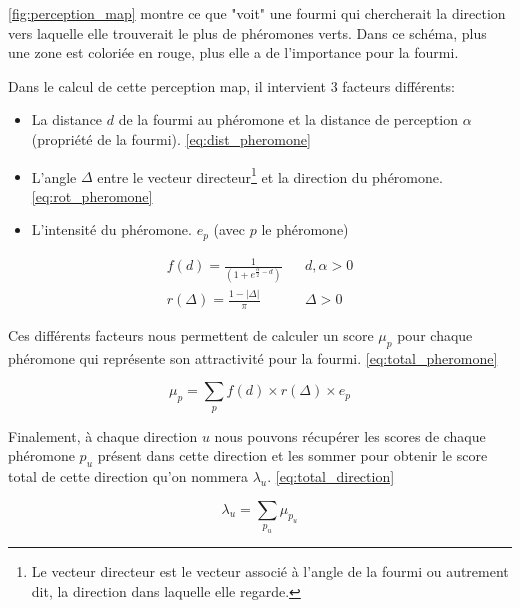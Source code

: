\documentclass{EPUProjetDi}
\begin{document}
\autoref{fig:perception_map} montre ce que "voit" une fourmi qui chercherait la direction vers laquelle elle trouverait le plus de phéromones verts.
Dans ce schéma, plus une zone est coloriée en rouge, plus elle a de l'importance pour la fourmi.

\pagebreak

Dans le calcul de cette perception map, il intervient 3 facteurs différents:
\begin{itemize}
    \item La distance $d$ de la fourmi au phéromone et la distance de perception $\alpha$ (propriété de la fourmi). \eqref{eq:dist_pheromone}
    \item L'angle $\Delta$ entre le vecteur directeur\footnote{Le vecteur directeur est le vecteur associé à l'angle de la fourmi ou
    autrement dit, la direction dans laquelle elle regarde.} et la direction du phéromone. \eqref{eq:rot_pheromone}
    \item L'intensité du phéromone. $e_p$ (avec $p$ le phéromone)
\end{itemize}

\begin{subequations}
\begin{align}
    f(d)=\frac{1}{(1 + e^{\frac{\alpha}{2} - d})} && d,\alpha > 0 \label{eq:dist_pheromone}\\
    r(\Delta)= \frac{1-\left\lvert \Delta\right\rvert}{\pi} && \Delta \label{eq:rot_pheromone}> 0
\end{align}
\end{subequations}

Ces différents facteurs nous permettent de calculer un score $\mu_{p}$ pour chaque phéromone qui représente 
son attractivité pour la fourmi. \eqref{eq:total_pheromone}

\begin{equation}
    \mu_{p} = \sum_{p}{} f(d) \times r(\Delta) \times e_{p}
    \label{eq:total_pheromone}
\end{equation}

Finalement, à chaque direction $u$ nous pouvons récupérer les scores de chaque phéromone $p_{u}$ présent dans cette direction
et les sommer pour obtenir le score total de cette direction qu'on nommera $\lambda_{u}$. \eqref{eq:total_direction}

\begin{equation}
    \lambda_{u} = \sum_{p_{u}}{} \mu_{p_{u}}
    \label{eq:total_direction}
\end{equation}
\end{document}
